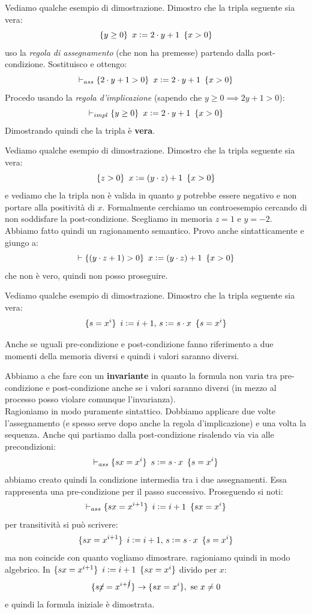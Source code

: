 \begin{esempio}
	Vediamo qualche esempio di dimostrazione. Dimostro che la tripla seguente sia
	vera:
	\[\{y\geq 0\}\,\,\, x\cceq 2\cdot y+1\,\,\,\{x>0\}\]
	uso la \emph{regola di assegnamento} (che non ha premesse) partendo dalla
	post-condizione. Sostituisco e ottengo:
	\[\vdash_{ass}\{2\cdot y+1> 0\}\,\,\, x\cceq 2\cdot y+1\,\,\,\{x>0\}\]
	Procedo usando la \emph{regola d'implicazione} (sapendo che $y\geq 0\implies
	2y+1>0$):
	\[\vdash_{impl}\{y\geq 0\}\,\,\, x\cceq 2\cdot y+1\,\,\,\{x>0\}\]
	Dimostrando quindi che la tripla è \textbf{vera}.
\end{esempio}
\begin{esempio}
	Vediamo qualche esempio di dimostrazione. Dimostro che la tripla seguente sia
	vera:
	\[\{z> 0\}\,\,\, x\cceq (y\cdot z)+1\,\,\,\{x>0\}\]
	e vediamo che la tripla non è valida in quanto $y$ potrebbe essere negativo e
	non portare alla positività di $x$. Formalmente cerchiamo un controesempio
	cercando di non soddisfare la post-condizione. Scegliamo in memoria $z=1$ e
	$y=-2$. Abbiamo fatto quindi un ragionamento semantico. Provo anche
	sintatticamente e giungo a:
	\[\vdash\{(y\cdot z+1)> 0\}\,\,\, x\cceq (y\cdot z)+1\,\,\,\{x>0\}\]
	che non è vero, quindi non posso proseguire.
\end{esempio}
\begin{esempio}
	Vediamo qualche esempio di dimostrazione. Dimostro che la tripla seguente sia
	vera:
	\[\{s=x^i\}\,\,\, i\cceq i+1,\, s\cceq s\cdot x\,\,\,\{s=x^i\}\]
	\begin{nota}
	Anche se uguali pre-condizione e post-condizione fanno riferimento a due momenti
		della memoria diversi e quindi i valori saranno diversi.
	\end{nota}
	Abbiamo a che fare con un \textbf{invariante} in quanto la formula non varia
	tra pre-condizione e post-condizione anche se i valori saranno diversi (in mezzo
	al processo posso violare comunque l'invarianza).\\
	Ragioniamo in modo puramente sintattico. Dobbiamo applicare due volte
	l'assegnamento (e spesso serve dopo anche la regola d'implicazione) e una
	volta la sequenza. Anche qui partiamo dalla post-condizione risalendo via via
	alle precondizioni:
	\[\vdash_{ass}\{sx=x^i\}\,\,\, s\cceq s\cdot x\,\,\,\{s=x^i\}\]
	abbiamo creato quindi la condizione intermedia tra i due assegnamenti. Essa rappresenta una pre-condizione per il passo successivo. Proseguendo si noti:
	\[\vdash_{ass}\{sx=x^{i+1}\}\,\,\, i\cceq i+1\,\,\,\{sx=x^i\}\]
	per transitività si può scrivere:
	\[\{sx=x^{i+1}\}\,\,\, i\cceq i+1,\, s\cceq s\cdot x\,\,\,\{s=x^i\}\]
	ma non coincide con quanto vogliamo dimostrare. ragioniamo quindi in modo
	algebrico. In $\{sx=x^{i+1}\}\,\,\, i\cceq i+1\,\,\,\{sx=x^i\}$ divido per $x$:
	\[\{s\cancel{x}=x^{i+\cancel{1}}\}\to\{sx=x^i\},\mbox{ se }x\neq 0\]
	e quindi la formula iniziale è dimostrata.
\end{esempio}
